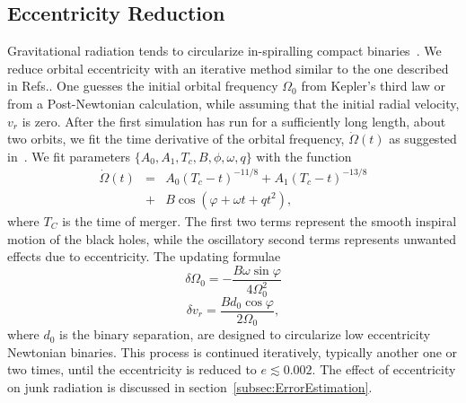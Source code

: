 \subsection{Eccentricity Reduction}
Gravitational radiation tends to circularize in-spiralling compact
binaries~\cite{PetersMathews1963,Peters1964}. We reduce orbital
eccentricity with an iterative method similar to the one described in
Refs.\cite{Boyle2007,Chu2009}. One guesses the initial orbital
frequency $\Omega_0$ from Kepler's third law or from a Post-Newtonian
calculation, while assuming that the initial radial velocity, $v_r$ is
zero. After the first simulation has run for a sufficiently long
length, about two orbits, we fit the time derivative of
the orbital frequency, $\dot{\Omega}(t)$ as suggested
in~\cite{Buonanno:2010yk}.  We fit parameters $\{A_0, A_1, T_c, B, \phi, \omega, q\}$ with the function
\begin{eqnarray}
\dot{\Omega}(t)&=&A_0\left(T_c-t\right)^{-11/8}+A_1\left(T_c-t\right)^{-13/8}\\
&+&B\cos\left(\varphi + \omega
  t+qt^2\right), \nonumber
\end{eqnarray}
where $T_C$ is the time of merger. The first two terms represent the
smooth inspiral motion of the black holes, while the oscillatory
second terms represents unwanted effects due to eccentricity. The
updating formulae
\begin{equation}
\delta\Omega_0=-\frac{B\omega\sin{\varphi}}{4\Omega_0^2}
\end{equation}
\begin{equation}
\delta v_r = \frac{B d_0\cos{\varphi}}{2\Omega_0},
\end{equation}
where $d_0$ is the binary separation, are designed to circularize low eccentricity Newtonian binaries. This
process is continued iteratively, typically another one or two times,
until the eccentricity is reduced to $e\lesssim 0.002$. The effect of
eccentricity on junk radiation is discussed in section~\ref{subsec:ErrorEstimation}.

%

